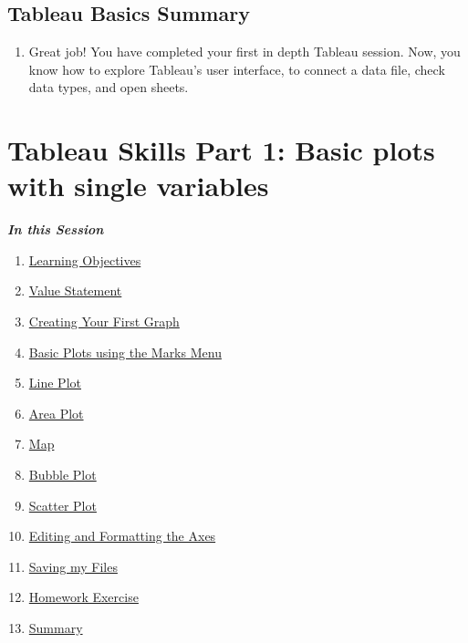 \documentclass[
]{book}
\providecommand{\tightlist}{%
  \setlength{\itemsep}{0pt}\setlength{\parskip}{0pt}}
\begin{document}
\hypertarget{tableau-basics-summary}{%
\subsection{Tableau Basics Summary}\label{tableau-basics-summary}}

\begin{enumerate}
\def\labelenumi{\arabic{enumi}.}
\tightlist
\item
  Great job! You have completed your first in depth Tableau session. Now, you know how to explore Tableau's user interface, to connect a data file, check data types, and open sheets.
\end{enumerate}

\hypertarget{tableau-skills-part-1-basic-plots-with-single-variables}{%
\section{Tableau Skills Part 1: Basic plots with single variables}\label{tableau-skills-part-1-basic-plots-with-single-variables}}

\textbf{\emph{In this Session}}

\begin{enumerate}
\def\labelenumi{\arabic{enumi}.}
\tightlist
\item
  \protect\hyperlink{basic-plots-learning-objectives}{Learning Objectives}
\item
  \protect\hyperlink{basic-plots-value-statement}{Value Statement}
\item
  \protect\hyperlink{creating-your-first-graph}{Creating Your First Graph}
\item
  \protect\hyperlink{basic-plots-using-the-marks-menu}{Basic Plots using the Marks Menu}
\item
  \protect\hyperlink{line-plot}{Line Plot}
\item
  \protect\hyperlink{area-plot}{Area Plot}
\item
  \protect\hyperlink{map}{Map}
\item
  \protect\hyperlink{bubble-plot}{Bubble Plot}
\item
  \protect\hyperlink{scatter-plot}{Scatter Plot}
\item
  \protect\hyperlink{editing-and-formatting-the-axes}{Editing and Formatting the Axes}
\item
  \protect\hyperlink{saving-my-files}{Saving my Files}
\item
  \protect\hyperlink{homework-exercise}{Homework Exercise}
\item
  \protect\hyperlink{tableau-skills-part-1-summary}{Summary}
\end{enumerate}
\end{document}
